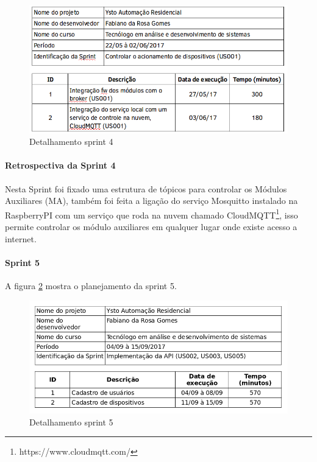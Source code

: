 \begin{figure}[H]
\caption{\label{sprint-4} Detalhamento sprint 4}
\includegraphics[scale=0.5]{img/sprint-4.png}
\end{figure}


\paragraph{Retrospectiva da Sprint 4} Nesta Sprint foi fixado uma estrutura de tópicos para controlar os Módulos Auxiliares (MA), também foi feita a ligação do serviço Mosquitto instalado na RaspberryPI com um serviço que roda na nuvem chamado CloudMQTT\footnote{https://www.cloudmqtt.com/}, isso permite controlar os módulo auxiliares em qualquer lugar onde existe acesso a internet.

\paragraph{Sprint 5} A figura \ref{sprint-5} mostra o planejamento da sprint 5.

\begin{figure}[H]
\caption{\label{sprint-5} Detalhamento sprint 5}
\includegraphics[scale=0.5]{img/sprint-5.png}
\end{figure}

